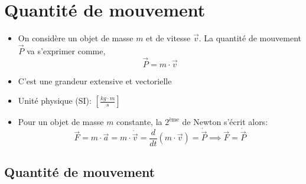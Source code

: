 \documentclass[
    11pt,
    a4paper,
    oneside,
    headinlcude, footinclude,
    twoside,
]{report}
\renewcommand{\vec}[1]{\overrightarrow{#1}}
\begin{document}
\section{Quantité de mouvement}
\label{sec:quantite_de_mouvement}

\begin{itemize}
    \item On considère un objet de masse $m$ et de vitesse $\vec v$. La
        quantité de mouvement $\vec P$ va s'exprimer comme, 
        \begin{equation}
            \vec P = m \cdot \vec v 
        \end{equation}
    \item C'est une grandeur extensive et vectorielle
    \item Unité physique (SI): $[\frac{kg \cdot m}{s}]$
    \item Pour un objet de masse $m$ constante, la $2^{\text{ème}}$ de Newton
        s'écrit alors:
        \begin{equation}
            \vec F = m \cdot \vec a = m \cdot \dot{\vec v} = \frac{d}{dt} (m
            \cdot \vec v) = \dot{\vec P} \implies \vec F = \dot{\vec P}
        \end{equation}
\end{itemize}


\subsection{Quantité de mouvement}
\end{document}
